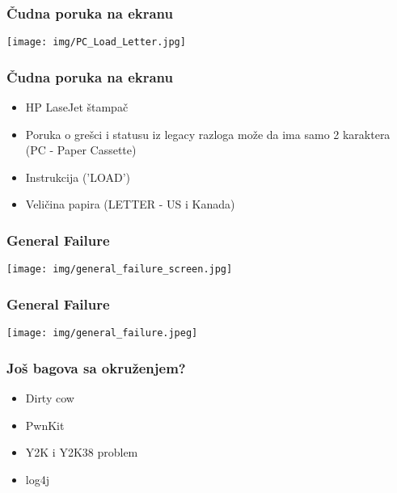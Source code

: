 \documentclass{beamer}
\begin{document}
\begin{frame}
    \frametitle{Čudna poruka na ekranu}

    \begin{center}
        \texttt{[image: img/PC\_Load\_Letter.jpg]}
    \end{center}
    

\end{frame}

\begin{frame}
    \frametitle{Čudna poruka na ekranu}
    \begin{itemize}
        \item HP LaseJet štampač \newline
        \item Poruka o grešci i statusu iz legacy razloga može da ima samo 2 karaktera (PC - Paper Cassette)\newline 
        \item Instrukcija ('LOAD') \newline
        \item Veličina papira (LETTER - US i Kanada)
    \end{itemize}
\end{frame}

\begin{frame}
    \frametitle{General Failure}
    \begin{center}
        \texttt{[image: img/general\_failure\_screen.jpg]}
    \end{center}
\end{frame}

\begin{frame}
    \frametitle{General Failure}
    \begin{center}
        \texttt{[image: img/general\_failure.jpeg]}
    \end{center}
\end{frame}

\begin{frame}
    \frametitle{Još bagova sa okruženjem?}
    \begin{itemize}
        \item Dirty cow \newline
        \item PwnKit \newline
        \item Y2K i Y2K38 problem \newline
        \item log4j \newline
    \end{itemize}
\end{frame}
\end{document}
